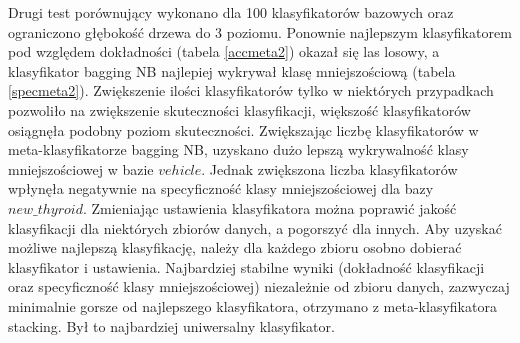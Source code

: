 Drugi test porównujący wykonano dla 100 klasyfikatorów bazowych oraz ograniczono głębokość drzewa do 3 poziomu. Ponownie najlepszym klasyfikatorem pod względem dokładności (tabela \ref{accmeta2}) okazał się las losowy, a klasyfikator bagging NB najlepiej wykrywał klasę mniejszościową (tabela \ref{specmeta2}). Zwiększenie ilości klasyfikatorów tylko w niektórych przypadkach pozwoliło na zwiększenie skuteczności klasyfikacji, większość klasyfikatorów osiągnęła podobny poziom skuteczności. Zwiększając liczbę klasyfikatorów w meta-klasyfikatorze bagging NB, uzyskano dużo lepszą wykrywalność klasy mniejszościowej w bazie $vehicle$. Jednak zwiększona liczba klasyfikatorów wpłynęła negatywnie na specyficzność klasy mniejszościowej dla bazy $new\_thyroid$. Zmieniając ustawienia klasyfikatora można poprawić jakość klasyfikacji dla niektórych zbiorów danych, a pogorszyć dla innych. Aby uzyskać możliwe najlepszą klasyfikację, należy dla każdego zbioru osobno dobierać klasyfikator i ustawienia. Najbardziej stabilne wyniki (dokładność klasyfikacji oraz specyficzność klasy mniejszościowej) niezależnie od zbioru danych, zazwyczaj minimalnie gorsze od najlepszego klasyfikatora, otrzymano z meta-klasyfikatora stacking. Był to najbardziej uniwersalny klasyfikator.
